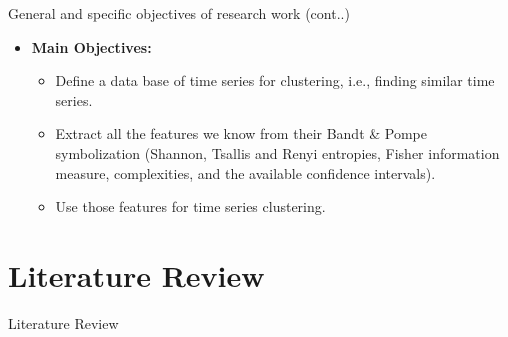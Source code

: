 \documentclass{beamer}
\begin{document}
\begin{frame}{General and specific objectives of research work (cont..)}
\begin{itemize}
	\item \textbf{Main Objectives:}
	\begin{itemize}
		\item Define a data base of time series for clustering, i.e., finding similar time series. 
		\item Extract all the features we know from their Bandt \& Pompe symbolization (Shannon, Tsallis and Renyi entropies, Fisher information measure, complexities, and the available confidence intervals).
		\item Use those features for time series clustering.
	\end{itemize} 
\end{itemize}	

\end{frame}


\section{Literature Review}
\begin{frame}
	\begin{center}
		\alert{Literature Review}
	\end{center}
\end{frame}

\end{document}
